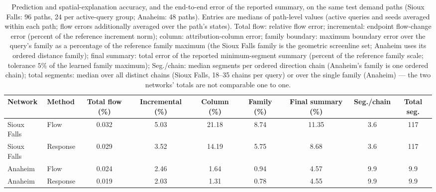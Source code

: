 \begin{table}[t]\centering\footnotesize
\caption{Prediction and spatial-explanation accuracy, and the end-to-end
error of the reported summary, on the same test demand paths (Sioux
Falls: 96 paths, 24 per active-query group; Anaheim: 48 paths). Entries
are medians of path-level values (active queries and seeds averaged
within each path; flow errors additionally averaged over the path's
states). Total flow: relative flow error; incremental: endpoint
flow-change error (percent of the reference increment norm); column:
attribution-column error; family boundary: maximum boundary error over
the query's family as a percentage of the reference family maximum (the
Sioux Falls family is the geometric screenline set; Anaheim uses its
ordered distance family); final summary: total error of the reported
minimum-segment summary (percent of the reference family scale;
tolerance $5\%$ of the learned family maximum); Seg./chain: median
segments per ordered direction chain (Anaheim's family is one ordered
chain); total segments: median over all distinct chains (Sioux Falls,
18--35 chains per query) or over the single family (Anaheim) --- the two
networks' totals are not comparable one to one.}\label{tab:pathtable}
\setlength{\tabcolsep}{3.4pt}
\begin{tabular*}{\tblwidth}{@{\extracolsep{\fill}}llccccccc}
\toprule
Network & Method & Total flow (\%) & Incremental (\%) & Column (\%) & Family (\%) & Final summary (\%) & Seg./chain & Total seg.\\
\midrule
Sioux Falls & Flow & 0.032 & 5.03 & 21.18 & 8.74 & 11.35 & 3.6 & 117\\
Sioux Falls & Response & 0.029 & 3.52 & 14.19 & 5.75 & 8.68 & 3.6 & 117\\
\addlinespace
Anaheim & Flow & 0.024 & 2.46 & 1.64 & 0.94 & 4.57 & 9.9 & 9.9\\
Anaheim & Response & 0.019 & 2.03 & 1.31 & 0.78 & 4.55 & 9.9 & 9.9\\
\bottomrule\end{tabular*}\end{table}

